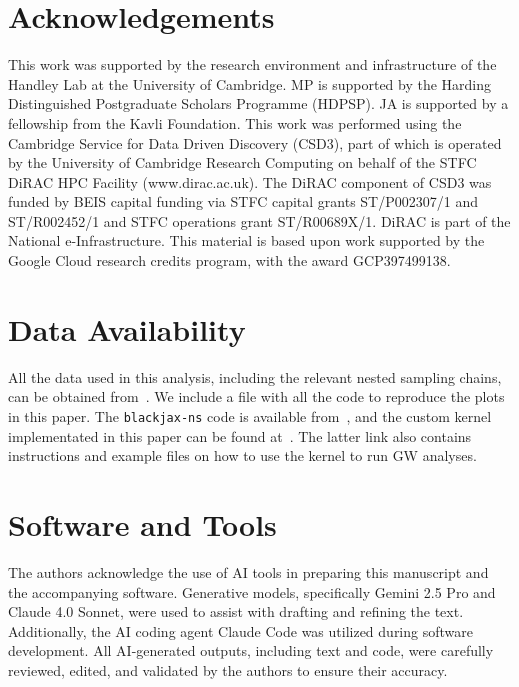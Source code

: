 \documentclass[fleqn,usenatbib]{mnras}
\begin{document}
\section*{Acknowledgements}

This work was supported by the research environment and infrastructure of the Handley Lab at the University of Cambridge.
MP is supported by the Harding Distinguished Postgraduate Scholars Programme (HDPSP). 
JA is supported by a fellowship from the Kavli Foundation.
This work was performed using the Cambridge Service for Data Driven Discovery (CSD3), 
part of which is operated by the University of Cambridge Research Computing on behalf of the
STFC DiRAC HPC Facility (www.dirac.ac.uk). The DiRAC component of CSD3 was funded by BEIS 
capital funding via STFC capital grants ST/P002307/1 and ST/R002452/1 and STFC operations 
grant ST/R00689X/1. DiRAC is part of the National e-Infrastructure.
This material is based upon work supported by the Google Cloud research
credits program, with the award GCP397499138.

\section*{Data Availability}

All the data used in this analysis, including the relevant nested sampling chains, 
can be obtained from~\cite{Prathaban_2025_zenodo}. We include a file with all the 
code to reproduce the plots in this paper. The \texttt{blackjax-ns} code is available 
from~\cite{blackjax_ns_github}, and the custom kernel implementated in this paper can
be found at~\cite{Prathaban_2025_github}. The latter link also contains instructions and
example files on how to use the kernel to run GW analyses.

\section*{Software and Tools}

The authors acknowledge the use of AI tools in preparing this manuscript 
and the accompanying software. Generative models, specifically Gemini 
2.5 Pro and Claude 4.0 Sonnet, were used to assist with drafting and 
refining the text. Additionally, the AI coding agent Claude Code 
was utilized during software development. All AI-generated 
outputs, including text and code, were carefully reviewed, 
edited, and validated by the authors to ensure their accuracy.

\end{document}

